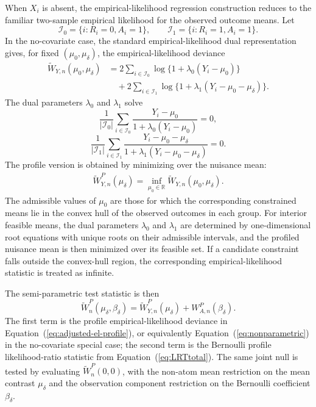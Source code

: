 \documentclass[11pt]{article}
\begin{document}
When $X_i$ is absent, the empirical-likelihood regression construction reduces to the familiar two-sample empirical likelihood for the observed outcome means. Let
\[
\mathcal{I}_0 = \{i:R_i = 0, A_i = 1\},
\qquad
\mathcal{I}_1 = \{i:R_i = 1, A_i = 1\}.
\]
In the no-covariate case, the standard empirical-likelihood dual representation gives, for fixed $(\mu_0,\mu_\delta)$, the empirical-likelihood deviance
\begin{align}
  \widetilde{W}_{Y,n}(\mu_0,\mu_\delta)
  &=2\sum_{i\in\mathcal{I}_0}
    \log\{1+\lambda_0(Y_i-\mu_0)\}\nonumber\\
  &\quad+2\sum_{i\in\mathcal{I}_1}
    \log\{1+\lambda_1(Y_i-\mu_0-\mu_\delta)\}.\label{eq:nonparametric}
\end{align}
The dual parameters $\lambda_0$ and $\lambda_1$ solve
\[
\frac{1}{|\mathcal{I}_0|}\sum_{i\in\mathcal{I}_0}
\frac{Y_i-\mu_0}{1+\lambda_0(Y_i-\mu_0)}=0,
\]
\[
\frac{1}{|\mathcal{I}_1|}\sum_{i\in\mathcal{I}_1}
\frac{Y_i-\mu_0-\mu_\delta}{1+\lambda_1(Y_i-\mu_0-\mu_\delta)}=0.
\]
The profile version is obtained by minimizing over the nuisance mean:
\begin{align*}
  \widetilde{W}_{Y,n}^P(\mu_\delta) = \inf_{\mu_0 \in \mathbb{R}} \widetilde{W}_{Y,n}(\mu_0,\mu_\delta).
\end{align*}
The admissible values of $\mu_0$ are those for which the corresponding constrained means lie in the convex hull of the observed outcomes in each group. For interior feasible means, the dual parameters $\lambda_0$ and $\lambda_1$ are determined by one-dimensional root equations with unique roots on their admissible intervals, and the profiled nuisance mean is then minimized over its feasible set. If a candidate constraint falls outside the convex-hull region, the corresponding empirical-likelihood statistic is treated as infinite.

The semi-parametric test statistic is then
\begin{equation}
  \widetilde{W}_n^P(\mu_\delta, \beta_\delta)
  = \widetilde{W}_{Y,n}^P(\mu_\delta) + W_{A,n}^P(\beta_\delta).\label{eq:LRT_SP_total}
\end{equation}
The first term is the profile empirical-likelihood deviance in Equation~(\ref{eq:adjusted-el-profile}), or equivalently Equation~(\ref{eq:nonparametric}) in the no-covariate special case; the second term is the Bernoulli profile likelihood-ratio statistic from Equation~(\ref{eq:LRTtotal}). The same joint null is tested by evaluating $\widetilde{W}_n^P(0,0)$, with the non-atom mean restriction on the mean contrast $\mu_\delta$ and the observation component restriction on the Bernoulli coefficient $\beta_\delta$.
\end{document}
